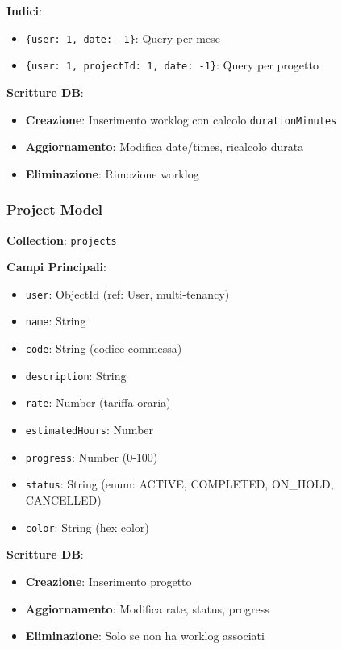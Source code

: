 \documentclass[11pt,a4paper]{article}
\begin{document}
\textbf{Indici}:
\begin{itemize}
    \item \texttt{\{user: 1, date: -1\}}: Query per mese
    \item \texttt{\{user: 1, projectId: 1, date: -1\}}: Query per progetto
\end{itemize}

\textbf{Scritture DB}:
\begin{itemize}
    \item \textbf{Creazione}: Inserimento worklog con calcolo \texttt{durationMinutes}
    \item \textbf{Aggiornamento}: Modifica date/times, ricalcolo durata
    \item \textbf{Eliminazione}: Rimozione worklog
\end{itemize}

\subsubsection{Project Model}

\textbf{Collection}: \texttt{projects}

\textbf{Campi Principali}:
\begin{itemize}
    \item \texttt{user}: ObjectId (ref: User, multi-tenancy)
    \item \texttt{name}: String
    \item \texttt{code}: String (codice commessa)
    \item \texttt{description}: String
    \item \texttt{rate}: Number (tariffa oraria)
    \item \texttt{estimatedHours}: Number
    \item \texttt{progress}: Number (0-100)
    \item \texttt{status}: String (enum: ACTIVE, COMPLETED, ON_HOLD, CANCELLED)
    \item \texttt{color}: String (hex color)
\end{itemize}

\textbf{Scritture DB}:
\begin{itemize}
    \item \textbf{Creazione}: Inserimento progetto
    \item \textbf{Aggiornamento}: Modifica rate, status, progress
    \item \textbf{Eliminazione}: Solo se non ha worklog associati
\end{itemize}
\end{document}
